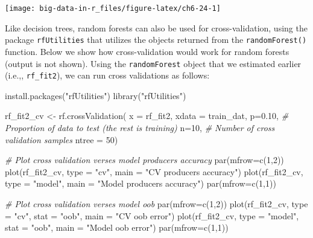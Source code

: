\documentclass[
]{book}
\newenvironment{Shaded}{\begin{snugshade}}{\end{snugshade}}
\newcommand{\AttributeTok}[1]{\textcolor[rgb]{0.77,0.63,0.00}{#1}}
\newcommand{\CommentTok}[1]{\textcolor[rgb]{0.56,0.35,0.01}{\textit{#1}}}
\newcommand{\DecValTok}[1]{\textcolor[rgb]{0.00,0.00,0.81}{#1}}
\newcommand{\FloatTok}[1]{\textcolor[rgb]{0.00,0.00,0.81}{#1}}
\newcommand{\FunctionTok}[1]{\textcolor[rgb]{0.00,0.00,0.00}{#1}}
\newcommand{\NormalTok}[1]{#1}
\newcommand{\OtherTok}[1]{\textcolor[rgb]{0.56,0.35,0.01}{#1}}
\newcommand{\StringTok}[1]{\textcolor[rgb]{0.31,0.60,0.02}{#1}}
\begin{document}
\texttt{[image: big-data-in-r\_files/figure-latex/ch6-24-1]}

Like decision trees, random forests can also be used for cross-validation, using the package \texttt{rfUtilities} that utilizes the objects returned from the \texttt{randomForest()} function. Below we show how cross-validation would work for random forests (output is not shown). Using the \texttt{randomForest} object that we estimated earlier (i.e.,, \texttt{rf\_fit2}), we can run cross validations as follows:

\begin{Shaded}
\begin{Highlighting}[]
\FunctionTok{install.packages}\NormalTok{(}\StringTok{"rfUtilities"}\NormalTok{)}
\FunctionTok{library}\NormalTok{(}\StringTok{"rfUtilities"}\NormalTok{)}

\NormalTok{rf\_fit2\_cv }\OtherTok{\textless{}{-}} \FunctionTok{rf.crossValidation}\NormalTok{(}
  \AttributeTok{x =}\NormalTok{ rf\_fit2, }
  \AttributeTok{xdata =}\NormalTok{ train\_dat,}
  \AttributeTok{p=}\FloatTok{0.10}\NormalTok{, }\CommentTok{\# Proportion of data to test (the rest is training)}
  \AttributeTok{n=}\DecValTok{10}\NormalTok{,   }\CommentTok{\# Number of cross validation samples}
  \AttributeTok{ntree =} \DecValTok{50}\NormalTok{)   }


\CommentTok{\# Plot cross validation verses model producers accuracy}
\FunctionTok{par}\NormalTok{(}\AttributeTok{mfrow=}\FunctionTok{c}\NormalTok{(}\DecValTok{1}\NormalTok{,}\DecValTok{2}\NormalTok{)) }
\FunctionTok{plot}\NormalTok{(rf\_fit2\_cv, }\AttributeTok{type =} \StringTok{"cv"}\NormalTok{, }\AttributeTok{main =} \StringTok{"CV producers accuracy"}\NormalTok{)}
\FunctionTok{plot}\NormalTok{(rf\_fit2\_cv, }\AttributeTok{type =} \StringTok{"model"}\NormalTok{, }\AttributeTok{main =} \StringTok{"Model producers accuracy"}\NormalTok{)}
\FunctionTok{par}\NormalTok{(}\AttributeTok{mfrow=}\FunctionTok{c}\NormalTok{(}\DecValTok{1}\NormalTok{,}\DecValTok{1}\NormalTok{)) }

\CommentTok{\# Plot cross validation verses model oob}
\FunctionTok{par}\NormalTok{(}\AttributeTok{mfrow=}\FunctionTok{c}\NormalTok{(}\DecValTok{1}\NormalTok{,}\DecValTok{2}\NormalTok{)) }
\FunctionTok{plot}\NormalTok{(rf\_fit2\_cv, }\AttributeTok{type =} \StringTok{"cv"}\NormalTok{, }\AttributeTok{stat =} \StringTok{"oob"}\NormalTok{, }\AttributeTok{main =} \StringTok{"CV oob error"}\NormalTok{)}
\FunctionTok{plot}\NormalTok{(rf\_fit2\_cv, }\AttributeTok{type =} \StringTok{"model"}\NormalTok{, }\AttributeTok{stat =} \StringTok{"oob"}\NormalTok{, }\AttributeTok{main =} \StringTok{"Model oob error"}\NormalTok{)    }
\FunctionTok{par}\NormalTok{(}\AttributeTok{mfrow=}\FunctionTok{c}\NormalTok{(}\DecValTok{1}\NormalTok{,}\DecValTok{1}\NormalTok{)) }
\end{Highlighting}
\end{Shaded}
\end{document}
